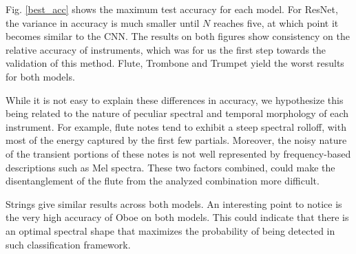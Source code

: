 \documentclass[runningheads,a4paper]{llncs}
\begin{document}
Fig. \ref{best_acc} shows the maximum test accuracy for each model. For ResNet, the variance in accuracy is much smaller until $N$ reaches five, at which point it becomes similar to the CNN. The results on both figures show consistency on the relative accuracy of instruments, which was for us the first step towards the validation of this method. Flute, Trombone and Trumpet yield the worst results for both models. 

While it is not easy to explain these differences in accuracy, we hypothesize this being related to the nature of peculiar spectral and temporal morphology of each instrument. For example, flute notes tend to exhibit a steep spectral rolloff, with most of the energy captured by the first few partials. Moreover, the noisy nature of the transient portions of these notes is not well represented by frequency-based descriptions such as Mel spectra. These two factors combined, could make the disentanglement of the flute from the analyzed combination more difficult.

Strings give similar results across both models. An interesting point to notice is the very high accuracy of Oboe on both models. This could indicate that there is an optimal spectral shape that maximizes the probability of being detected in such classification framework.
\end{document}
